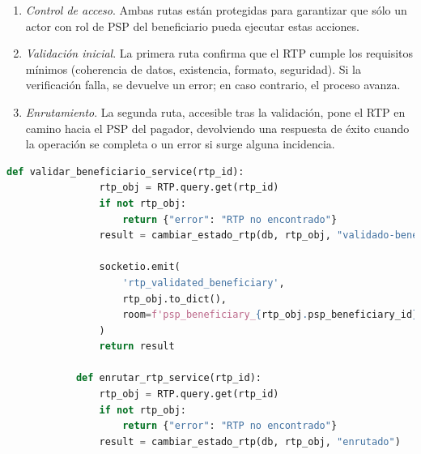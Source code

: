 \begin{itemize}
        \begin{enumerate}
          \item \emph{Control de acceso}.  
                Ambas rutas están protegidas para garantizar que sólo un actor
                con rol de PSP del beneficiario pueda ejecutar estas acciones.
          \item \emph{Validación inicial}.  
                La primera ruta confirma que el RTP cumple los requisitos
                mínimos (coherencia de datos, existencia, formato, seguridad).
                Si la verificación falla, se devuelve un error; en caso
                contrario, el proceso avanza.
          \item \emph{Enrutamiento}.  
                La segunda ruta, accesible tras la validación, pone el RTP en
                camino hacia el PSP del pagador, devolviendo una respuesta de
                éxito cuando la operación se completa o un error si surge
                alguna incidencia.
        \end{enumerate}
        \vspace{0.8em}

       \begin{lstlisting}[language=Python, style=custom]
            def validar_beneficiario_service(rtp_id):
                rtp_obj = RTP.query.get(rtp_id)
                if not rtp_obj:
                    return {"error": "RTP no encontrado"}
                result = cambiar_estado_rtp(db, rtp_obj, "validado-beneficiario")

                socketio.emit(
                    'rtp_validated_beneficiary',
                    rtp_obj.to_dict(),
                    room=f'psp_beneficiary_{rtp_obj.psp_beneficiary_id}'
                )
                return result

            def enrutar_rtp_service(rtp_id):
                rtp_obj = RTP.query.get(rtp_id)
                if not rtp_obj:
                    return {"error": "RTP no encontrado"}
                result = cambiar_estado_rtp(db, rtp_obj, "enrutado")


\end{lstlisting}
\end{itemize}
